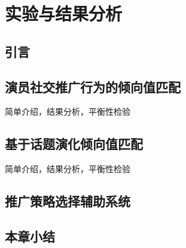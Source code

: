 \chapter{实验与结果分析}
\section{引言}
\section{演员社交推广行为的倾向值匹配}
简单介绍，结果分析，平衡性检验
\section{基于话题演化倾向值匹配}
简单介绍，结果分析，平衡性检验
\section{推广策略选择辅助系统}
\section{本章小结}